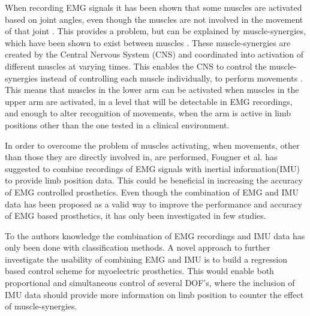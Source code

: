 When recording EMG signals it has been shown that some muscles are activated based on joint angles, even though the muscles are not involved in the movement of that joint \cite{Fougner2011}. This provides a problem, but can be explained by muscle-synergies, which have been shown to exist between muscles \cite{DeRugy2013}. These muscle-synergies are created by the Central Nervous System (CNS) and coordinated into activation of different muscles at varying times. This enables the CNS to control the muscle-synergies instead of controlling each muscle individually, to perform movements \cite{jiang2009}. This means that muscles in the lower arm can be activated when muscles in the upper arm are activated, in a level that will be detectable in EMG recordings, and enough to alter recognition of movements, when the arm is active in limb positions other than the one tested in a clinical environment. 

In order to overcome the problem of muscles activating, when movements, other than those they are directly involved in, are performed, Fougner et al. \cite{Fougner2011} has suggested to combine recordings of EMG signals with inertial information(IMU) to provide limb position data. This could be beneficial in increasing the accuracy of EMG controlled prosthetics. 
Even though the combination of EMG and IMU data has been proposed as a valid way to improve the performance and accuracy of EMG based prosthetics, it has only been investigated in few studies. \cite{Roy2010, Imtiaz2014, jiang2012}

To the authors knowledge the combination of EMG recordings and IMU data has only been done with classification methods. A novel approach to further investigate the usability of combining EMG and IMU is to build a regression based control scheme for myoelectric prosthetics. This would enable both proportional and simultaneous control of several DOF's, where the inclusion of IMU data should provide more information on limb position to counter the effect of muscle-synergies.






